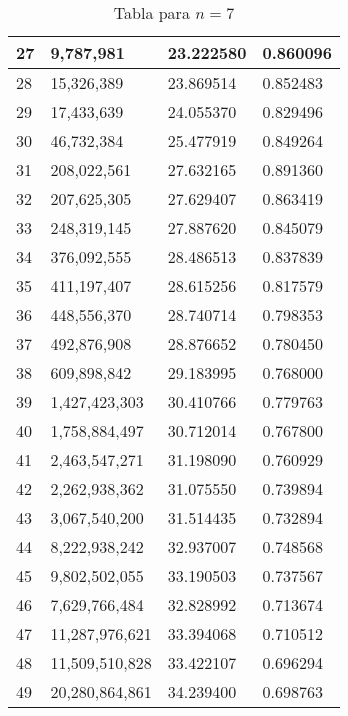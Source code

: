 \begin{table}[H]
{\begin{tabular}{| l | l | l | l |}
    27	&9,787,981	&23.222580	&0.860096 \\ \hline
    28	&15,326,389	&23.869514	&0.852483 \\ \hline
    29	&17,433,639	&24.055370	&0.829496 \\ \hline
    30	&46,732,384	&25.477919	&0.849264 \\ \hline
    31	&208,022,561	&27.632165	&0.891360 \\ \hline
    32	&207,625,305	&27.629407	&0.863419 \\ \hline
    33	&248,319,145	&27.887620	&0.845079 \\ \hline
    34	&376,092,555	&28.486513	&0.837839 \\ \hline
    35	&411,197,407	&28.615256	&0.817579 \\ \hline
    36	&448,556,370	&28.740714	&0.798353 \\ \hline
    37	&492,876,908	&28.876652	&0.780450 \\ \hline
    38	&609,898,842	&29.183995	&0.768000 \\ \hline
    39	&1,427,423,303	&30.410766	&0.779763 \\ \hline
    40	&1,758,884,497	&30.712014	&0.767800 \\ \hline
    41	&2,463,547,271	&31.198090	&0.760929 \\ \hline
    42	&2,262,938,362	&31.075550	&0.739894 \\ \hline
    43	&3,067,540,200	&31.514435	&0.732894 \\ \hline
    44	&8,222,938,242	&32.937007	&0.748568 \\ \hline
    45	&9,802,502,055	&33.190503	&0.737567 \\ \hline
    46	&7,629,766,484	&32.828992	&0.713674 \\ \hline
    47	&11,287,976,621	&33.394068	&0.710512 \\ \hline
    48	&11,509,510,828	&33.422107	&0.696294 \\ \hline
    49	&20,280,864,861	&34.239400	&0.698763 \\ \hline
  \end{tabular}
  \caption*{Tabla para $n=7$}
}
\end{table}

